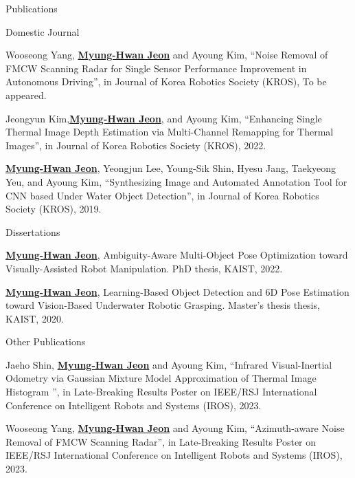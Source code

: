 \begin{rSection}{Publications}
\begin{pubSubsection}{Domestic Journal}
  \item Wooseong Yang, \underline{\textbf{Myung-Hwan Jeon}} and Ayoung Kim, “Noise Removal of FMCW Scanning Radar for Single Sensor Performance Improvement in Autonomous Driving”, in Journal of Korea Robotics Society (KROS), To be appeared.

  \item Jeongyun Kim,\underline{\textbf{Myung-Hwan Jeon}}, and Ayoung Kim, “Enhancing Single Thermal Image Depth Estimation via Multi-Channel Remapping for Thermal Images”, in Journal of Korea Robotics Society (KROS), 2022.
  
  \item\underline{\textbf{Myung-Hwan Jeon}}, Yeongjun Lee, Young-Sik Shin, Hyesu Jang, Taekyeong Yeu, and Ayoung Kim, “Synthesizing Image and Automated Annotation Tool for CNN based Under Water Object Detection”, in Journal of Korea Robotics Society (KROS), 2019.
  
\end{pubSubsection}

\begin{pubSubsection}{Dissertations}
  \item \underline{\textbf{Myung-Hwan Jeon}}, Ambiguity-Aware Multi-Object Pose Optimization toward Visually-Assisted Robot Manipulation. PhD thesis, \acf{KAIST}, 2022.
  
  \item \underline{\textbf{Myung-Hwan Jeon}}, Learning-Based Object Detection and 6D Pose Estimation toward Vision-Based Underwater Robotic Grasping. Master's thesis thesis, \acf{KAIST}, 2020.
  
\end{pubSubsection}

\begin{pubSubsection}{Other Publications}

  \item Jaeho Shin, \underline{\textbf{Myung-Hwan Jeon}} and Ayoung Kim, “Infrared Visual-Inertial Odometry via Gaussian Mixture Model Approximation of Thermal Image Histogram ”, in Late-Breaking Results Poster on IEEE/RSJ International Conference on Intelligent Robots and Systems (IROS), 2023.  
  
  \item Wooseong Yang, \underline{\textbf{Myung-Hwan Jeon}} and Ayoung Kim, “Azimuth-aware Noise Removal of FMCW Scanning Radar”, in Late-Breaking Results Poster on IEEE/RSJ International Conference on Intelligent Robots and Systems (IROS), 2023.  


\end{pubSubsection}
\end{rSection}
